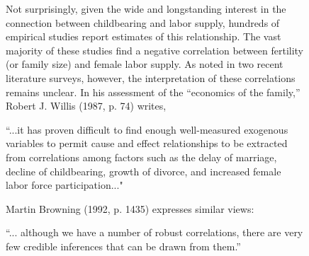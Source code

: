 \documentclass{article}
\begin{document}
\begin{figure}[!htbp]
{\begin{minipage}{45em}
\hspace{1cm} Not surprisingly, given the wide and longstanding interest in the connection between childbearing and labor supply, hundreds of empirical studies report estimates of this relationship. The vast majority of these studies find a negative correlation between fertility (or family size) and female labor supply. As noted in two recent literature surveys, however, the interpretation of these correlations remains unclear. In his assessment of the ``economics of the family,'' Robert J. Willis (1987, p. 74) writes,
\begin{displayquote}
``...it has proven difficult to find enough well-measured exogenous variables to permit cause and effect relationships to be extracted from correlations among factors such as the delay of marriage, decline of childbearing, growth of divorce, and increased female labor force participation..."
\end{displayquote}
Martin Browning (1992, p. 1435) expresses similar views:
\begin{displayquote}
``... although we have a number of robust correlations, there are very few credible inferences that can be drawn from them.''
\end{displayquote}
\vspace{.5cm}

\end{minipage}}
\end{figure}

\newpage
\end{document}
